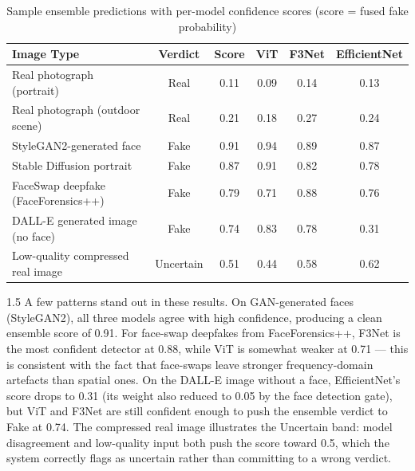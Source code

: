 \renewcommand{\arraystretch}{1.3}
\begin{table}[H]
  \centering
  \begin{tabular}{|p{3.2cm}|c|c|c|c|c|}
  \hline
  \textbf{Image Type} & \textbf{Verdict} & \textbf{Score} & \textbf{ViT} & \textbf{F3Net} & \textbf{EfficientNet} \\
  \hline
  Real photograph (portrait)          & Real      & 0.11 & 0.09  & 0.14  & 0.13 \\
  Real photograph (outdoor scene)     & Real      & 0.21 & 0.18  & 0.27  & 0.24 \\
  StyleGAN2-generated face            & Fake      & 0.91 & 0.94  & 0.89  & 0.87 \\
  Stable Diffusion portrait           & Fake      & 0.87 & 0.91  & 0.82  & 0.78 \\
  FaceSwap deepfake (FaceForensics++)  & Fake      & 0.79 & 0.71  & 0.88  & 0.76 \\
  DALL-E generated image (no face)    & Fake      & 0.74 & 0.83  & 0.78  & 0.31 \\
  Low-quality compressed real image   & Uncertain & 0.51 & 0.44  & 0.58  & 0.62 \\
  \hline
  \end{tabular}
  \caption{Sample ensemble predictions with per-model confidence scores (score = fused fake probability)}
  \label{tab:sample_preds}
\end{table}

\begin{spacing}{1.5}
A few patterns stand out in these results. On GAN-generated faces (StyleGAN2), all three models agree with high confidence, producing a clean ensemble score of 0.91. For face-swap deepfakes from FaceForensics++, F3Net is the most confident detector at 0.88, while ViT is somewhat weaker at 0.71 --- this is consistent with the fact that face-swaps leave stronger frequency-domain artefacts than spatial ones. On the DALL-E image without a face, EfficientNet's score drops to 0.31 (its weight also reduced to 0.05 by the face detection gate), but ViT and F3Net are still confident enough to push the ensemble verdict to Fake at 0.74. The compressed real image illustrates the Uncertain band: model disagreement and low-quality input both push the score toward 0.5, which the system correctly flags as uncertain rather than committing to a wrong verdict.
\end{spacing}

